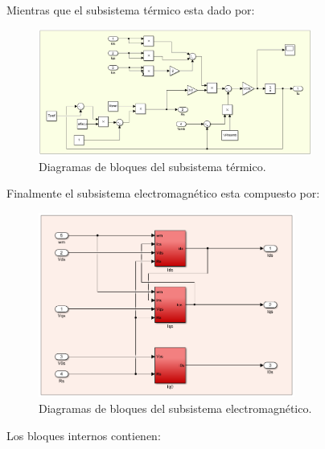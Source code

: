 \documentclass{article}
\begin{document}
Mientras que el subsistema térmico esta dado por:

\begin{figure}[H]
    \centering
    \includegraphics[width=0.8\textwidth]{sub_termico.png}
    \caption{Diagramas de bloques del subsistema térmico.}
\end{figure}

Finalmente el subsistema electromagnético esta compuesto por:

\begin{figure}[H]
    \centering
    \includegraphics[width=0.75\textwidth]{sub_electromagentico.png}
    \caption{Diagramas de bloques del subsistema electromagnético.}
\end{figure}

Los bloques internos contienen:
\end{document}
